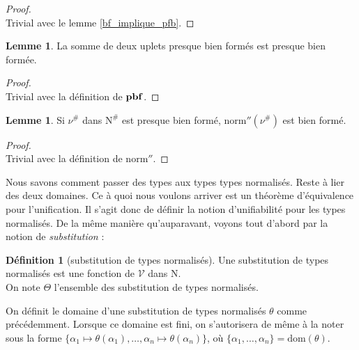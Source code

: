 \documentclass[a4paper]{report}
\newenvironment{preuve} 
	{\begin{proof}~\\} 
	{\end{proof}}
\theoremstyle{definition}
\newtheorem{definition}[theoreme]{Définition}
\newtheorem{lemme}[theoreme]{Lemme}
\newcommand{\norm}{\mathrm{norm}}
\newcommand{\V}{\mathscr{V}}
\newcommand{\N}{\mathrm{N}}
\begin{document}
\begin{preuve}
	Trivial avec le lemme \ref{bf_implique_pfb}.
\end{preuve}

\begin{lemme} \label{pbf_implique_msomme_pbf}
	La somme de deux uplets presque bien formés est presque bien formée.
\end{lemme}

\begin{preuve}
	Trivial avec la définition de $\bold{pbf}$.
\end{preuve}

\begin{lemme} \label{pbf_implique_norm''_bf}
	Si $\nu^\#$ dans $\N^\#$ est presque bien formé, $\norm'' (\nu^\#)$ est bien formé.
\end{lemme}

\begin{preuve}
	Trivial avec la définition de $\norm''$.
\end{preuve}

Nous savons comment passer des types aux types types normalisés. Reste à lier des deux domaines. Ce à quoi nous voulons arriver est un théorème d'équivalence pour l'unification. Il s'agit donc de définir la notion d'unifiabilité pour les types normalisés. De la même manière qu'auparavant, voyons tout d'abord par la notion de \emph{substitution} :

\begin{definition}[substitution de types normalisés]
	Une substitution de types normalisés est une fonction de $\V$ dans $\N$. \\
	On note $\Theta$ l'ensemble des substitution de types normalisés.
\end{definition}

On définit le domaine d'une substitution de types normalisés $\theta$ comme précédemment. Lorsque ce domaine est fini, on s'autorisera de même à la noter sous la forme $\{ \alpha_1 \mapsto \theta (\alpha_1), \dots, \alpha_n \mapsto \theta (\alpha_n) \}$, où $\{ \alpha_1, \dots, \alpha_n \} = \mathrm{dom} (\theta)$.
\end{document}
